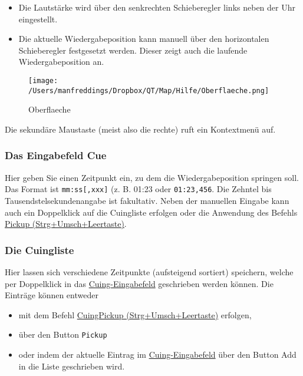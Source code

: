 \documentclass[a4paper,DIV=11
]{scrartcl}
\begin{document}
\begin{itemize}
\item
  Die Lautstärke wird über den senkrechten Schieberegler links neben der
  Uhr eingestellt.
\item
  Die aktuelle Wiedergabeposition kann manuell über den horizontalen
  Schieberegler festgesetzt werden. Dieser zeigt auch die laufende
  Wiedergabeposition an.
\end{itemize}

\begin{figure}
\centering
\texttt{[image: /Users/manfreddings/Dropbox/QT/Map/Hilfe/Oberflaeche.png]}
\caption{Oberflaeche}
\end{figure}

Die sekundäre Maustaste (meist also die rechte) ruft ein Kontextmenü
auf.

\hypertarget{das-eingabefeld-cue}{%
\subsubsection{Das Eingabefeld Cue}\label{das-eingabefeld-cue}}

Hier geben Sie einen Zeitpunkt ein, zu dem die Wiedergabeposition
springen soll. Das Format ist \texttt{mm:ss{[},xxx{]}} (z. B. 01:23 oder
\texttt{01:23,456}. Die Zehntel bis Tausendstelsekundenangabe ist
fakultativ. Neben der manuellen Eingabe kann auch ein Doppelklick auf
die Cuingliste erfolgen oder die Anwendung des Befehls
\protect\hyperlink{Pickup}{Pickup (Strg+Umsch+Leertaste)}.

\hypertarget{die-cuingliste}{%
\subsubsection{Die Cuingliste}\label{die-cuingliste}}

Hier lassen sich verschiedene Zeitpunkte (aufsteigend sortiert)
speichern, welche per Doppelklick in das
\protect\hyperlink{EingabefeldCue}{Cuing-Eingabefeld} geschrieben werden
können. Die Einträge können entweder

\begin{itemize}
\item
  mit dem Befehl \protect\hyperlink{Pickup}{Cuing\textbar Pickup
  (Strg+Umsch+Leertaste)} erfolgen,
\item
  über den Button \texttt{Pickup}
\item
  oder indem der aktuelle Eintrag im
  \protect\hyperlink{EingabefeldCue}{Cuing-Eingabefeld} über den Button
  Add in die Liste geschrieben wird.
\end{itemize}
\end{document}
